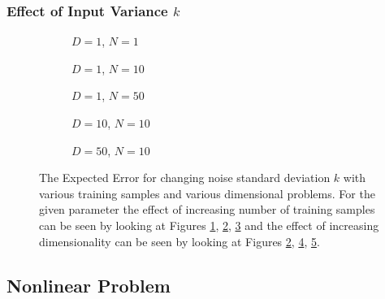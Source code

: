 \subsubsection{Effect of Input Variance $k$}
\begin{figure}[!h]
  \centering
    \begin{subfigure}{0.3\textwidth}
      \centering
      \caption{$D=1$, $N=1$}
      \label{fig:linear-b-N-1-D-1}
    \end{subfigure}
    \begin{subfigure}{0.3\textwidth}
      \centering
      \caption{$D=1$, $N=10$}
      \label{fig:linear-b-N-10-D-1}
    \end{subfigure}
    \begin{subfigure}{0.3\textwidth}
      \centering
      \caption{$D=1$, $N=50$}
      \label{fig:linear-b-N-50-D-1}
    \end{subfigure}

    \begin{subfigure}{0.3\textwidth}
      \centering
      \caption{$D=10$, $N=10$}
      \label{fig:linear-b-N-10-D-10}
    \end{subfigure}
    \begin{subfigure}{0.3\textwidth}
      \centering
      \caption{$D=50$, $N=10$}
      \label{fig:linear-b-N-10-D-50}
    \end{subfigure}  

  \caption{The Expected Error for changing noise standard deviation $k$ with various training samples and various dimensional problems. For the given parameter the effect of increasing number of training samples can be seen by looking at Figures \ref{fig:linear-b-N-1-D-1}, \ref{fig:linear-b-N-10-D-1}, \ref{fig:linear-b-N-50-D-1} and the effect of increasing dimensionality can be seen by looking at Figures \ref{fig:linear-b-N-10-D-1}, \ref{fig:linear-b-N-10-D-10}, \ref{fig:linear-b-N-10-D-50}.}\label{fig:linear-b}
\end{figure}


\subsection{Nonlinear Problem}

